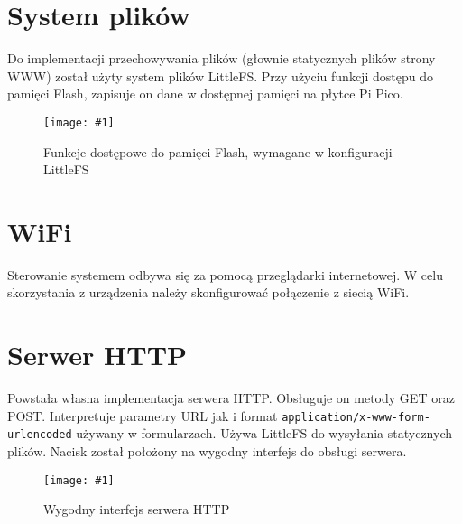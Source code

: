 \documentclass[12pt]{article}
\newcommand{\imgcustomsize}[3]{
	\begin{figure}[H]
		\centering
		\texttt{[image: \#1]}
		\caption{#2}
	\end{figure}
}
\newcommand{\img}[2]{\imgcustomsize{#1}{#2}{0.8}}
\begin{document}
	 \section{System plików}
	 	Do implementacji przechowywania plików (głownie statycznych plików strony WWW) został użyty system plików LittleFS. Przy użyciu funkcji dostępu do pamięci Flash, zapisuje on dane w dostępnej pamięci na płytce Pi Pico.
	 	\img{pgm/littlefs}{Funkcje dostępowe do pamięci Flash, wymagane w konfiguracji LittleFS}

	 \section{WiFi}
        Sterowanie systemem odbywa się za pomocą przeglądarki internetowej. W celu skorzystania z urządzenia należy skonfigurować połączenie z siecią WiFi.


	 \section{Serwer HTTP}
	 	Powstała własna implementacja serwera HTTP. Obsługuje on metody GET oraz POST. Interpretuje parametry URL jak i format \lstinline|application/x-www-form-urlencoded| używany w formularzach. Używa LittleFS do wysyłania statycznych plików. Nacisk został położony na wygodny interfejs do obsługi serwera.
	 	\img{pgm/http_init}{Wygodny interfejs serwera HTTP}
	 
\end{document}
